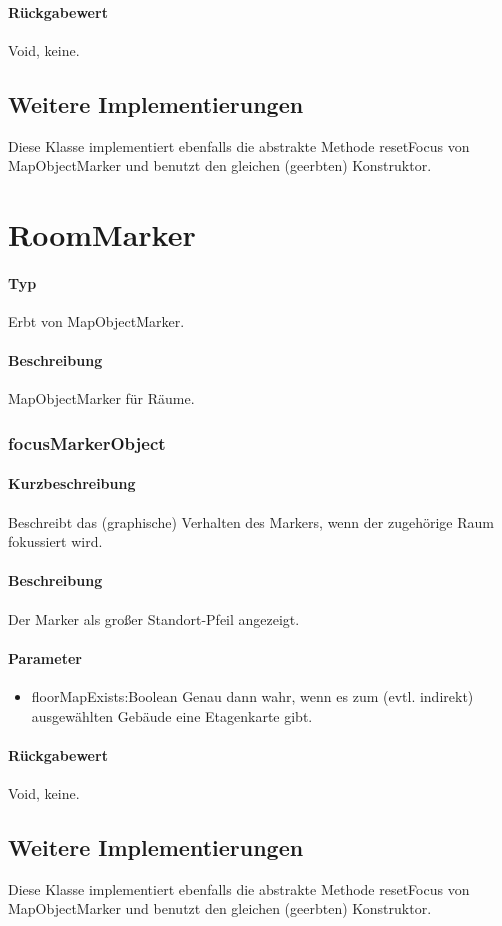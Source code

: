 \paragraph*{Rückgabewert}
Void, keine.

\subsection{Weitere Implementierungen}
Diese Klasse implementiert ebenfalls die abstrakte Methode resetFocus von MapObjectMarker 
und benutzt den gleichen (geerbten) Konstruktor.


\section{RoomMarker}
\paragraph*{Typ} 
Erbt von MapObjectMarker.
\paragraph*{Beschreibung}
MapObjectMarker für Räume.

\subsubsection{focusMarkerObject}%
\paragraph*{Kurzbeschreibung}
Beschreibt das (graphische) Verhalten des Markers, wenn der zugehörige Raum fokussiert wird.
\paragraph*{Beschreibung}
Der Marker als großer Standort-Pfeil angezeigt.
\paragraph*{Parameter}
\begin{itemize}
    \item floorMapExists:Boolean Genau dann wahr, wenn es zum (evtl. indirekt) ausgewählten Gebäude eine Etagenkarte gibt.
\end{itemize}
\paragraph*{Rückgabewert}
Void, keine.

\subsection{Weitere Implementierungen}
Diese Klasse implementiert ebenfalls die abstrakte Methode resetFocus von MapObjectMarker 
und benutzt den gleichen (geerbten) Konstruktor.
